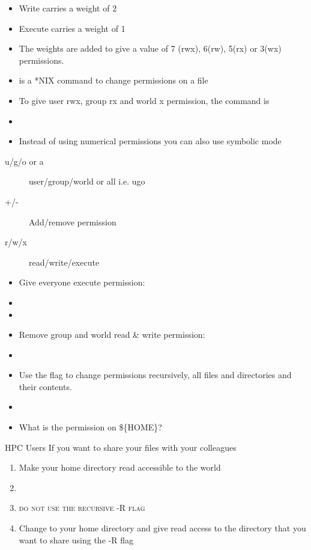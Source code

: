 \documentclass[10pt,t]{beamer}
\begin{document}
\begin{frame}
\begin{itemize}
    \item Write carries a weight of 2
    \item Execute carries a weight of 1
    \item The weights are added to give a value of 7 (rwx), 6(rw), 5(rx) or 3(wx) permissions. 
    \item {} is a *NIX command to change permissions on a file
    \item To give user rwx, group rx and world x permission, the command is
    \item[] 
    \item Instead of using numerical permissions you can also use symbolic mode
  \end{itemize}
  \begin{description}
    \item[u/g/o or a] user/group/world or all i.e. ugo
    \item[+/-] Add/remove permission
    \item[r/w/x] read/write/execute
  \end{description}
  \begin{itemize}
    \item Give everyone execute permission: 
    \item[] 
    \item[] 
    \item Remove group and world read \& write permission: 
    \item[] 
    \item Use the  flag to change permissions recursively, all files and directories and their contents.
    \item[] 
    \item[] What is the permission on \$\{HOME\}?
  \end{itemize}
  \begin{exampleblock}{HPC Users}
    If you want to share your files with your colleagues
    \begin{enumerate}
      \item Make your home directory read accessible to the world
      \item[] 
      \item[] \textsc{do not use the recursive -R flag}
      \item Change to your home directory and give read access to the directory that you want to share using the -R flag
    \end{enumerate} 
  \end{exampleblock}
\end{frame}
\end{document}
